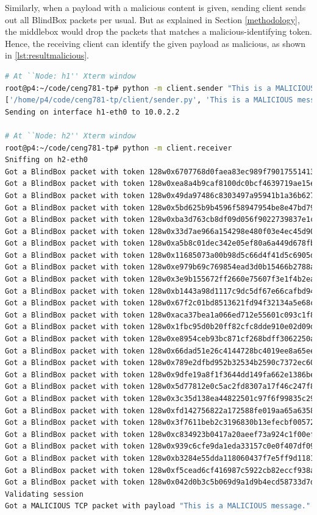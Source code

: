 \documentclass{winslabreport}
\begin{document}
Similarly, when a payload with a malicious content is given, sending client sends out all BlindBox packets per usual. But as explained in Section \ref{methodology}, the middlebox would drop the packets that matches a malicious-identifying token. Hence, the receiving client can identify the given payload as malicious, as shown in \autoref{lst:resultmalicious}.

\begin{lstlisting}[caption={A Malicious Message},label={lst:resultmalicious},language=bash]
# At ``Node: h1'' Xterm window
root@p4:~/code/ceng781-tp# python -m client.sender "This is a MALICIOUS message."
['/home/p4/code/ceng781-tp/client/sender.py', 'This is a MALICIOUS message.']
Sending on interface h1-eth0 to 10.0.2.2

# At ``Node: h2'' Xterm window
root@p4:~/code/ceng781-tp# python -m client.receiver
Sniffing on h2-eth0
Got a BlindBox packet with token 128w0x6707768d0faea83ec989f79017551413
Got a BlindBox packet with token 128w0xea8a4b9caf8100dc0bcf4639719ae15e
Got a BlindBox packet with token 128w0x49da97486c8303497a95941b1a36b627
Got a BlindBox packet with token 128w0x5bd625b9b4596f58947954be8e47bd79
Got a BlindBox packet with token 128w0xba3d763cb8df09d056f9022739837e1c
Got a BlindBox packet with token 128w0x33d7ae966a154298e480f03e4ec45d90
Got a BlindBox packet with token 128w0xa5b8c01dec342e05ef80a6a449d678fb
Got a BlindBox packet with token 128w0x11685073a00b98d5c66d4f41d5c6905d
Got a BlindBox packet with token 128w0xe979b69c769854ead3d0b15466b2788a
Got a BlindBox packet with token 128w0x3e9b155672ff2660e75607f3e1f4b2ea
Got a BlindBox packet with token 128w0xb1443a98d1117c9dc5df67e66cafbd94
Got a BlindBox packet with token 128w0x67f2c01bd8513621fd94f32134a5e68c
Got a BlindBox packet with token 128w0xaca37bea1a066ed712e55601c093c1f8
Got a BlindBox packet with token 128w0x1fbc95d0b20ff82cfc8dde910e02d09d
Got a BlindBox packet with token 128w0xe8954ceb93bc871cf268bdff3062250a
Got a BlindBox packet with token 128w0x66dad51e26c4144728bc4019ee8a65ee
Got a BlindBox packet with token 128w0x789e2dfbd952b32534b2590c7372ec60
Got a BlindBox packet with token 128w0x9dfe19a8f1f3644dd149fa662e1386be
Got a BlindBox packet with token 128w0x5d77812e0c5ac2fd8307a17f46c247f8
Got a BlindBox packet with token 128w0x3c35d138ea44822501c97f6f99835c29
Got a BlindBox packet with token 128w0xfd142756822a172588fe019aa65a6358
Got a BlindBox packet with token 128w0x3f7611beb2c3196830b13efecbf00572
Got a BlindBox packet with token 128w0xc834923b0417a20aeef73a924c1f00ef
Got a BlindBox packet with token 128w0x939c6cfe9da1eda33157c0e0f407df09
Got a BlindBox packet with token 128w0xb3284e55dda118060437f7e5ff9d1181
Got a BlindBox packet with token 128w0xf5cead6cf416987c5922cb82eccf938a
Got a BlindBox packet with token 128w0x042d0b3c5b069d9a1d9b4ecd58733d7d
Validating session
Got a MALICIOUS TCP packet with payload "This is a MALICIOUS message."
\end{lstlisting}
\end{document}
